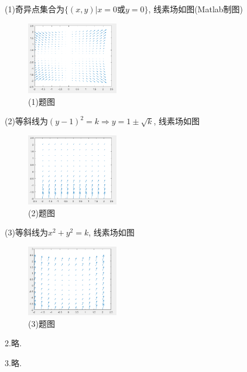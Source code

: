 \begin{solve}(1)奇异点集合为$\{(x,y)|x=0\mbox{或}y=0\}$, 线素场如图(Matlab制图)
\begin{figure}[htb]
\centering
\includegraphics[width=4cm]{ODE1_2_1.png}
\caption{(1)题图}
\end{figure}

(2)等斜线为$(y-1)^2=k\Rightarrow y=1\pm\sqrt{k}$, 线素场如图
\begin{figure}[htb]
\centering
\includegraphics[width=4cm]{ODE1_2_2.png}
\caption{(2)题图}
\end{figure}

(3)等斜线为$x^2+y^2=k$, 线素场如图
\begin{figure}[htb]
\centering
\includegraphics[width=4cm]{ODE1_2_3.png}
\caption{(3)题图}
\end{figure}
\end{solve}

2.略.

3.略.
